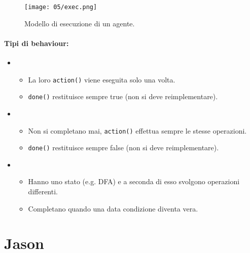 
\begin{figure}[!h]
    \centering
    \texttt{[image: 05/exec.png]}
  \caption{Modello di esecuzione di un agente.}
\end{figure}

\paragraph{Tipi di behaviour:}

\begin{itemize}
  \item {}
    \begin{itemize}
      \item La loro \texttt{action()} viene eseguita solo una volta. 
      \item \texttt{done()} restituisce sempre true (non si deve reimplementare).
    \end{itemize}
  \item {}
    \begin{itemize}
      \item Non si completano mai, \texttt{action()} effettua sempre le stesse operazioni. 
      \item \texttt{done()} restituisce sempre false (non si deve reimplementare).
    \end{itemize}
  \item {}
    \begin{itemize}
      \item Hanno uno stato (e.g. DFA) e a seconda di esso svolgono operazioni differenti. 
      \item Completano quando una data condizione diventa vera.
    \end{itemize}
\end{itemize}







\section{Jason}
